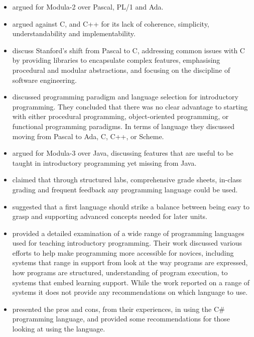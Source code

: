 \begin{itemize}[noitemsep,nolistsep]
	\item \citet{Koffman:1988} argued for Modula-2 over Pascal, PL/1 and Ada.
	\item \citet{Mody:1991} argued against C, and C++ for its lack of coherence, simplicity, understandability and implementability. 

	\item \citet{Roberts:1993} discuss Stanford's shift from Pascal to C, addressing common issues with C by providing libraries to encapsulate complex features, emphasising procedural and modular abstractions, and focusing on the discipline of software engineering.

	\item \citet{Brilliant:1996} discussed programming paradigm and language selection for introductory programming. They concluded that there was no clear advantage to starting with either procedural programming, object-oriented programming, or functional programming paradigms. In terms of language they discussed moving from Pascal to Ada, C, C++, or Scheme.

	\item \citet{Boszormenyi:1998} argued for Modula-3 over Java, discussing features that are useful to be taught in introductory programming yet missing from Java.

	\item \citet{Howell:2003} claimed that through structured labs, comprehensive grade sheets, in-class grading and frequent feedback any programming language could be used.

	\item \citet{Gupta:2004} suggested that a first language should strike a balance between being easy to grasp and supporting advanced concepts needed for later units.

	\item \citet{Kelleher:2005} provided a detailed examination of a wide range of programming languages used for teaching introductory programming. Their work discussed various efforts to help make programming more accessible for novices, including systems that range in support from look at the way programs are expressed, how programs are structured, understanding of program execution, to systems that embed learning support. While the work reported on a range of systems it does not provide any recommendations on which language to use.

	\item \citet{Bishop:2006} presented the pros and cons, from their experiences, in using the C\# programming language, and provided some recommendations for those looking at using the language.


\end{itemize}
